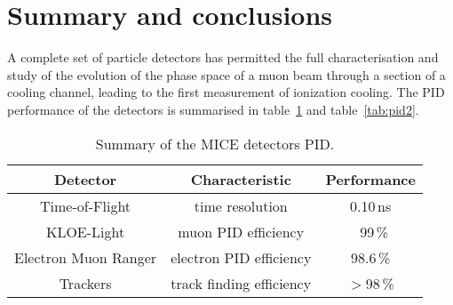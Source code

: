 \graphicspath{{80-Conclusions/Figures/}}

\section{Summary and conclusions}
\label{Sect:Conclusions}

A complete set of particle detectors has permitted the full characterisation and study of the evolution of the phase space of a muon beam through a section of a cooling channel, leading to the first measurement of ionization cooling.
The PID performance of the detectors is summarised in table~\ref{tab:pid1} and table~\ref{tab:pid2}.

\begin{table}[htb!]
	\caption{Summary of the MICE detectors PID.}
  \begin{center}
	\begin{tabular}{c|c|c}
	  \textbf{Detector}              & \textbf{Characteristic}            & \textbf{Performance} \\
		\hline
    Time-of-Flight        & time resolution           & 0.10\,ns    \\
    KLOE-Light            & muon PID efficiency       & ~99\,\%       \\
    Electron Muon Ranger  & electron PID efficiency   & 98.6\,\%      \\
    Trackers              & track finding efficiency  & $>$98\,\%     \\
  \end{tabular}
	\label{tab:pid1}
  \end{center}
\end{table}

